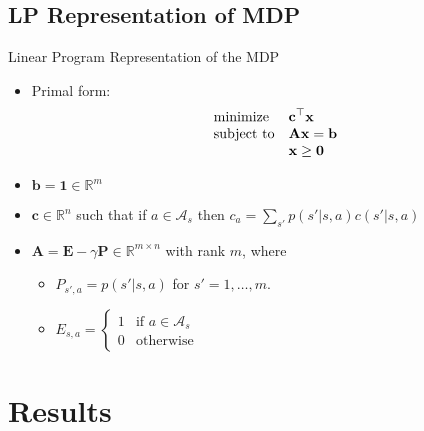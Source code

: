\documentclass{beamer}
\newcommand{\R}{\mathbb{R}}
\renewcommand{\vec}[1]{\mathbf{#1}}
\begin{document}
\subsection{LP Representation of MDP}
\begin{frame}{Linear Program Representation of the MDP}
\begin{itemize}[<+->]
\item <1-> Primal form:
\begin{equation*}
\begin{array}{ll@{}ll}
\text{minimize}  & \displaystyle \vec{c}^\top\vec{x}\\
\text{subject to}& \displaystyle \vec{Ax}=\vec{b}\\
                         &  \displaystyle\vec{x}\geq\vec{0}
\end{array}
\end{equation*}
\item <2-> $\vec{b}=\vec{1}\in\R^{m}$ 
\item <3-> $\vec{c}\in\R^{ n}$ such that if $a\in \mathcal{A}_s$ then $c_a=\sum_{s'}p(s'|s,a)c(s'|s,a)$
\item <4-> $\vec{A}=\vec{E}-\gamma\vec{P}\in\R^{m\times n}$ with rank $m$, where 
\begin{itemize}
\item $P_{s',a}=p(s'|s,a)$ for $s'=1,\dots,m$.
\item $E_{s,a}=
\begin{cases}
  1 & \text{if } a\in\mathcal{A}_s \\
  0          & \text{otherwise}
\end{cases}$
\end{itemize}

\end{itemize}
\end{frame}



\section{Results}
\end{document}
